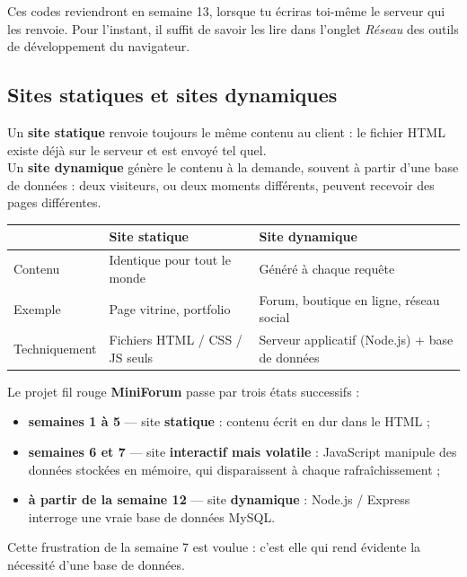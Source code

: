 \documentclass[a4paper,11pt]{article}
\newcommand{\hdr}[1]{\multicolumn{1}{l}{\color{white}\bfseries #1}}
\renewcommand{\arraystretch}{1.3}
\begin{document}
\begin{tcolorbox}[astuce, title={On y reviendra}]
Ces codes reviendront en semaine 13, lorsque tu écriras toi-même le serveur qui les renvoie. Pour l'instant, il suffit de savoir les lire dans l'onglet \textit{Réseau} des outils de développement du navigateur.
\end{tcolorbox}

\subsection{Sites statiques et sites dynamiques}

\begin{tcolorbox}[definition, title={Définition --- Statique et dynamique}]
Un \textbf{site statique} renvoie toujours le même contenu au client : le fichier HTML existe déjà sur le serveur et est envoyé tel quel.\\
Un \textbf{site dynamique} génère le contenu à la demande, souvent à partir d'une base de données : deux visiteurs, ou deux moments différents, peuvent recevoir des pages différentes.
\end{tcolorbox}

\begin{center}
\renewcommand{\arraystretch}{1.0}
\begin{tabularx}{\linewidth}{lXX}
  \toprule
  \rowcolor{uniNavy}
  \hdr{} &  \hdr{Site statique} &  \hdr{Site dynamique} \\
  \midrule
  \rowcolor{uniPaper}
  Contenu & Identique pour tout le monde & Généré à chaque requête \\
  Exemple & Page vitrine, portfolio & Forum, boutique en ligne, réseau social \\
  \rowcolor{uniPaper}
  Techniquement & Fichiers HTML / CSS / JS seuls & Serveur applicatif (Node.js) + base de données \\
  \bottomrule
\end{tabularx}
\end{center}

\begin{tcolorbox}[attention, title={Où se situe MiniForum ?}]
Le projet fil rouge \textbf{MiniForum} passe par trois états successifs :
\begin{itemize}
  \item \textbf{semaines 1 à 5} --- site \textbf{statique} : contenu écrit en dur dans le HTML ;
  \item \textbf{semaines 6 et 7} --- site \textbf{interactif mais volatile} : JavaScript manipule des données stockées en mémoire, qui disparaissent à chaque rafraîchissement ;
  \item \textbf{à partir de la semaine 12} --- site \textbf{dynamique} : Node.js / Express interroge une vraie base de données MySQL.
\end{itemize}
Cette frustration de la semaine 7 est voulue : c'est elle qui rend évidente la nécessité d'une base de données.
\end{tcolorbox}
\end{document}
